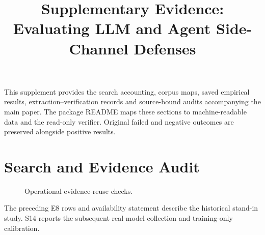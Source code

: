 \documentclass[conference,compsoc]{IEEEtran}
\title{Supplementary Evidence: Evaluating LLM and Agent Side-Channel Defenses}
\author{}
\begin{document}
\maketitle
This supplement provides the search accounting, corpus maps, saved empirical results, extraction--verification records and source-bound audits accompanying the main paper. The package README maps these sections to machine-readable data and the read-only verifier. Original failed and negative outcomes are preserved alongside positive results.
\section{Search and Evidence Audit}\label{app:search}





















\begin{figure}[t]\centering\caption{Operational evidence-reuse checks.}\label{fig:defense-decision}\end{figure}
\clearpage
\onecolumn




\clearpage

\par\noindent The preceding E8 rows and availability statement describe the historical stand-in study. S14 reports the subsequent real-model collection and training-only calibration.\par
\clearpage


\clearpage
\end{document}
